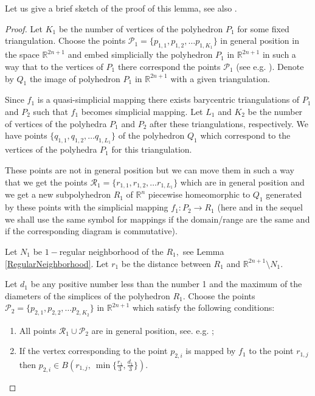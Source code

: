 Let us give a brief sketch of the proof of this lemma, see also
\cite[Exercise 3.4.5]{DV} .
\begin{proof}
Let $K_1$ be the number of vertices of the polyhedron $P_1$ for
some fixed triangulation. Choose the points $\mathcal{P}_1 =
\{p_{1,1},p_{1,2},\dots p_{1,K_1}\}$ in general position in the
space $\mathbb{R}^{2n+1}$ and embed simplicially the polyhedron
$P_1$ in $\mathbb{R}^{2n+1}$ in such a way that to the vertices of
$P_1$ there correspond the points $\mathcal{P}_1$ (see  e.g.
\cite{HW, SeTh}). Denote by $Q_1$ the image of polyhedron $P_1$ in
$\mathbb{R}^{2n+1}$ with a given triangulation.

Since $f_1$ is a quasi-simplicial mapping there exists barycentric
triangulations of $P_1$ and $P_2$ such that $f_1$ becomes
simplicial mapping. Let $L_1$ and $K_2$ be the number of vertices
of the polyhedra $P_1$ and $P_2$ after these triangulations,
respectively. We have points $\{q_{1,1}, q_{1,2},\dots
q_{1,L_1}\}$ of the polyhedron $Q_1$ which correspond to the
vertices of the polyhedra $P_1$ for this triangulation. 

These
points are not in general position but we can move them in such a
way that we get the points $\mathcal{R}_1 = \{r_{1,1},
r_{1,2},\dots r_{1,L_1}\}$ which are in general position and we
get a new subpolyhedron $R_1$ of $\mathbb{R}^n$ piecewise
homeomorphic to $Q_1$ generated by these points with the
simplicial mapping $f_1:P_2 \to R_1$ (here and in the sequel we
shall use the same symbol for mappings if the domain/range are the
same and if the corresponding diagram is commutative). 

Let $N_1$
be $1-$regular neighborhood of the $R_1,$ see Lemma
\ref{RegularNeighborhood}. Let $r_1$ be the distance between $R_1$
and $\mathbb{R}^{2n+1}\setminus N_1.$

Let $d_1$ be any positive number less than the number 1 and the
maximum of the diameters of the simplices of the polyhedron $R_1.$
Choose the points $\mathcal{P}_2 = \{p_{2,1},p_{2,2},\dots
p_{2,K_2}\}$ in $\mathbb{R}^{2n+1}$ which satisfy the following
conditions:
\begin{enumerate}
    \item All points $\mathcal{R}_1\cup \mathcal{P}_2$ are in
    general position, see. e.g. \cite[p. 102, Theorem 1.10.2]{E};
    \item If the vertex corresponding to the point $p_{2,i}$ is mapped by $f_1$ to the point
    $r_{1,j}$ then $p_{2,i}\in B(r_{1,j},\ \min\{\frac{r_1}{3},
    \frac{d_1}{3}\})$.
\end{enumerate}


\end{proof}
